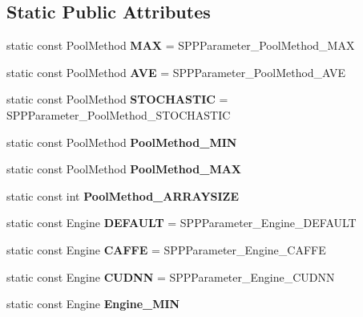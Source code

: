 \subsection*{Static Public Attributes}
\begin{DoxyCompactItemize}
\item 
\mbox{\label{classcaffe_1_1_s_p_p_parameter_a580cb40b51fe900d01f690dfd332a551}} 
static const Pool\+Method {\bfseries M\+AX} = S\+P\+P\+Parameter\+\_\+\+Pool\+Method\+\_\+\+M\+AX
\item 
\mbox{\label{classcaffe_1_1_s_p_p_parameter_a5baab6ecbcdde59391232d050b04d218}} 
static const Pool\+Method {\bfseries A\+VE} = S\+P\+P\+Parameter\+\_\+\+Pool\+Method\+\_\+\+A\+VE
\item 
\mbox{\label{classcaffe_1_1_s_p_p_parameter_aafa08dce390a9066f24e8a05749d1eac}} 
static const Pool\+Method {\bfseries S\+T\+O\+C\+H\+A\+S\+T\+IC} = S\+P\+P\+Parameter\+\_\+\+Pool\+Method\+\_\+\+S\+T\+O\+C\+H\+A\+S\+T\+IC
\item 
static const Pool\+Method {\bfseries Pool\+Method\+\_\+\+M\+IN}
\item 
static const Pool\+Method {\bfseries Pool\+Method\+\_\+\+M\+AX}
\item 
static const int {\bfseries Pool\+Method\+\_\+\+A\+R\+R\+A\+Y\+S\+I\+ZE}
\item 
\mbox{\label{classcaffe_1_1_s_p_p_parameter_a5526241d102c9973e8aa1dced8735618}} 
static const Engine {\bfseries D\+E\+F\+A\+U\+LT} = S\+P\+P\+Parameter\+\_\+\+Engine\+\_\+\+D\+E\+F\+A\+U\+LT
\item 
\mbox{\label{classcaffe_1_1_s_p_p_parameter_a335a17bf4d0460c2317e6058b73c11e6}} 
static const Engine {\bfseries C\+A\+F\+FE} = S\+P\+P\+Parameter\+\_\+\+Engine\+\_\+\+C\+A\+F\+FE
\item 
\mbox{\label{classcaffe_1_1_s_p_p_parameter_ab09ef28445751e11c6c4576832180415}} 
static const Engine {\bfseries C\+U\+D\+NN} = S\+P\+P\+Parameter\+\_\+\+Engine\+\_\+\+C\+U\+D\+NN
\item 
static const Engine {\bfseries Engine\+\_\+\+M\+IN}
\item 

\end{DoxyCompactItemize}

